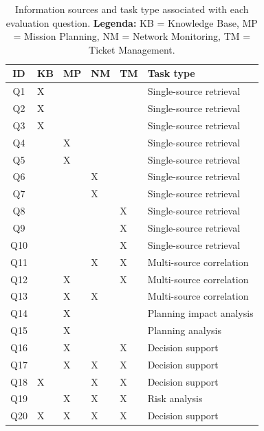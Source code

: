 \begin{table}[htbp]
\centering
\caption{Information sources and task type associated with each evaluation question. \textbf{Legenda:} KB = Knowledge Base, MP = Mission Planning, NM = Network Monitoring, TM = Ticket Management.}
\label{tab:question_sources}
\renewcommand{\arraystretch}{1.1}
\begin{tabularx}{\textwidth}{c *{4}{>{\centering\arraybackslash}X} l}
\toprule
\textbf{ID} & \textbf{KB} & \textbf{MP} & \textbf{NM} & \textbf{TM} & \textbf{Task type} \\
\midrule
Q1  & X &   &   &   & Single-source retrieval \\
Q2  & X &   &   &   & Single-source retrieval \\
Q3  & X &   &   &   & Single-source retrieval \\
Q4  &   & X &   &   & Single-source retrieval \\
Q5  &   & X &   &   & Single-source retrieval \\
Q6  &   &   & X &   & Single-source retrieval \\
Q7  &   &   & X &   & Single-source retrieval \\
Q8  &   &   &   & X & Single-source retrieval \\
Q9  &   &   &   & X & Single-source retrieval \\
Q10 &   &   &   & X & Single-source retrieval \\
\midrule
Q11 &   &   & X & X & Multi-source correlation \\
Q12 &   & X &   & X & Multi-source correlation \\
Q13 &   & X & X &   & Multi-source correlation \\
Q14 &   & X &   &   & Planning impact analysis \\
Q15 &   & X &   &   & Planning analysis \\
Q16 &   & X &   & X & Decision support \\
\midrule
Q17 &   & X & X & X & Decision support \\
Q18 & X &   & X & X & Decision support \\
Q19 &   & X & X & X & Risk analysis \\
Q20 & X & X & X & X & Decision support \\
\bottomrule
\end{tabularx}
\end{table}




